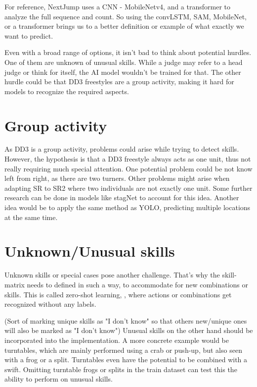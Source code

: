 For reference, NextJump uses a CNN - MobileNetv4, \autocite{MobileNetv4_2024} and a transformer to analyze the full sequence and count. So using the convLSTM, SAM, MobileNet, or a transformer brings us to a better definition or example of what exactly we want to predict.


Even with a broad range of options, it isn't bad to think about potential hurdles. One of them are unknown of unusual skills. While a judge may refer to a head judge or think for itself, the AI model wouldn't be trained for that. The other hurdle could be that DD3 freestyles are a group activity, making it hard for models to recognize the required aspects. 

\section{Group activity}

As DD3 is a group activity, problems could arise while trying to detect skills. However, the hypothesis is that a DD3 freestyle always acts as one unit, thus not really requiring much special attention. One potential problem could be not know left from right, as there are two turners. Other problems might arise when adapting SR to SR2 where two individuals are not exactly one unit. Some further research can be done in models like stagNet \autocite{Qi_2020} to account for this idea. Another idea would be to apply the same method as YOLO, predicting multiple locations at the same time.




\section{Unknown/Unusual skills}
\label{lit:unknown-unusual-skills}

Unknown skills or special cases pose another challenge. That's why the skill-matrix needs to defined in such a way, to accommodate for new combinations or skills. This is called zero-shot learning, \autocite{Pourpanah_2022}, where actions or combinations get recognized without any labels.

(Sort of marking unique skills as "I don't know" so that others new/unique ones will also be marked as "I don't know") Unusual skills on the other hand should be incorporated into the implementation.
A more concrete example would be turntables, which are mainly performed using a crab or push-up, but also seen with a frog or a split.
Turntables even have the potential to be combined with a swift. Omitting turntable frogs or splits in the train dataset can test this the ability to perform on unusual skills.




